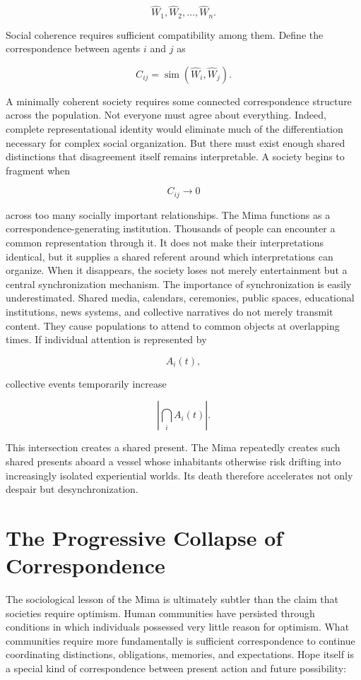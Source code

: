 \documentclass[11pt,oneside]{book}
\theoremstyle{definition}
\theoremstyle{remark}
\begin{document}
\[
\widehat W_1, \widehat W_2, \ldots, \widehat W_n.
\]

Social coherence requires sufficient compatibility among them. Define the correspondence between
agents \(i\) and \(j\) as

\[
C_{ij} = \operatorname{sim} (\widehat W_i,\widehat W_j).
\]

A minimally coherent society requires some connected correspondence structure across the population.
Not everyone must agree about everything. Indeed, complete representational identity would eliminate
much of the differentiation necessary for complex social organization. But there must exist enough
shared distinctions that disagreement itself remains interpretable. A society begins to fragment
when

\[
C_{ij}\rightarrow0
\]

across too many socially important relationships. The Mima functions as a correspondence-generating
institution. Thousands of people can encounter a common representation through it. It does not make
their interpretations identical, but it supplies a shared referent around which interpretations can
organize. When it disappears, the society loses not merely entertainment but a central
synchronization mechanism. The importance of synchronization is easily underestimated. Shared media,
calendars, ceremonies, public spaces, educational institutions, news systems, and collective
narratives do not merely transmit content. They cause populations to attend to common objects at
overlapping times. If individual attention is represented by

\[
A_i(t),
\]

collective events temporarily increase

\[
\left|\bigcap_i A_i(t)\right|.
\]

This intersection creates a shared present. The Mima repeatedly creates such shared presents aboard
a vessel whose inhabitants otherwise risk drifting into increasingly isolated experiential worlds.
Its death therefore accelerates not only despair but desynchronization.

\section{The Progressive Collapse of Correspondence}

The sociological lesson of the Mima is ultimately subtler than the claim that societies require
optimism. Human communities have persisted through conditions in which individuals possessed very
little reason for optimism. What communities require more fundamentally is sufficient correspondence
to continue coordinating distinctions, obligations, memories, and expectations. Hope itself is a
special kind of correspondence between present action and future possibility:
\end{document}
